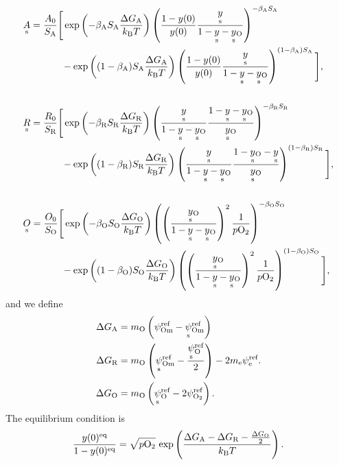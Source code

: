 \documentclass{article}
\numberwithin{equation}{section}
\newcommand{\us}[1]{\underset{\textrm{s}}{#1}{}}
\def\kB{k_\mathrm{B}}
\def\Ox{\mathrm{O}}
\newcommand{\OO}{{\ce{O2}}}
\def\ys{\us y}
\def\y0{y(0)}
\def\yOs{\us y_\textrm{O}}
\def\pO2{p\OO}
\def\A0{A_0}
\def\R0{R_0}
\def\K0{O_0}
\def\DGA{\Delta G_\textrm{A}  }
\def\DGR{\Delta G_\textrm{R}  }
\def\DGO{\Delta G_\textrm{O}  }
\def\betaA{\beta_\textrm{A}}
\def\betaR{\beta_\textrm{R}}
\def\betaO{\beta_\textrm{O}}
\def\SA{S_\textrm{A}}
\def\SR{S_\textrm{R}}
\def\SO{S_\textrm{O}}
\def\eq{\textrm{eq}}
\def\REF{\textrm{ref}}
\begin{document}
\begin{subequations}
\begin{align}
&\us A
=
\frac{\A0}{\SA}
\Bigg[
	\exp
	\left(
		{-\betaA \SA \frac{\DGA}{\kB T}}
	\right)
	\left(
		\frac{1 - \y0}{\y0}
		\frac{\ys}{1-\ys -\yOs}
	\right)^{-\betaA \SA}
\\ \nonumber
	&\quad \quad \quad \quad	
	-
	\exp
	\left(
		{(1-\betaA) \SA \frac{\DGA}{\kB T}}
	\right)
	\left(
		\frac{1 - \y0 }{\y0}
		\frac{\ys}{1-\ys-\yOs}
	\right)^{(1-\betaA) \SA}
\Bigg],
\\ \nonumber
\\
&\us R
=
\frac{\R0}{\SR}
\Bigg[
	\exp
	\left(
		{-\betaR \SR \frac{\DGR}{\kB T}}
	\right)
	\left(
		\frac{\ys}{1- \ys - \yOs}
		\frac{1 -\ys -\yOs}{\yOs}
	\right)^{-\betaR \SR}
\\ \nonumber
	& \quad \quad \quad \quad	
	-
	\exp
	\left(
		{(1 - \betaR) \SR \frac{\DGR}{\kB T}}
	\right)
	\left(
		\frac{\ys}{1- \ys - \yOs}
		\frac{1-\yOs - \ys}{\yOs}
	\right)^{(1-\betaR) \SR}
\Bigg],
\\ \nonumber
\\
&\us O
=
\frac{\K0}{\SO}
\Bigg[
	\exp
	\left(
		{-\betaO \SO \frac{\DGO}{\kB T}}
	\right)
	\left(
		\left(
			\frac{\yOs}{1-\ys-\yOs}
		\right)^2
		\frac{1}{\pO2}
	\right)^{-\betaO \SO}
\\ \nonumber
	&\quad \quad \quad \quad	
	-
	\exp
	\left(
		{(1-\betaO) \SO \frac{\DGO}{\kB T}}
	\right)
	\left(
		\left(
			\frac{\yOs}{1-\ys-\yOs}
		\right)^2
		\frac{1}{\pO2}
	\right)^{(1 - \betaO) \SO}
\Bigg],
\end{align}
\end{subequations}
and we define
\begin{subequations}
\begin{align}
\DGA
&=
m_\Ox
\left(
	\psi_{\textrm{Om}}^\REF
	-
	\us \psi_{\textrm{Om}}^\REF
\right)
\\
\DGR
&= 
m_\Ox
\left(
	\us \psi_{\textrm{Om}}^\REF
	-
	\frac{\us \psi_{\Ox}^\REF}{2}
\right)
-
2 m_\textrm{e} \psi_{\textrm{e}}^\REF.
\\
\DGO
&= 
m_\Ox
\left(
	\us \psi_{\Ox}^\REF
	-
	2 \psi_{\OO}^\REF
\right).
\end{align}
\end{subequations}
The equilibrium condition is
\begin{subequations}
\begin{align}
\frac{\y0^\eq}{1-\y0^\eq} = \sqrt{\pO2} \ \textrm{exp}
\left(
	\frac{\DGA - \DGR - \frac{\DGO}{2}}{\kB T}
\right).
\end{align}
\end{subequations}
\end{document}

